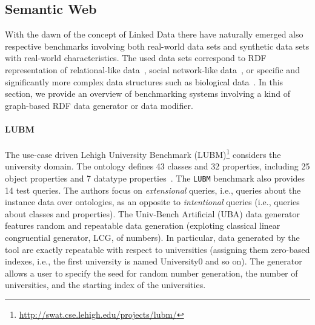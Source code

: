 \subsection{Semantic Web}
\label{sec:generators_LinkedData}
With the dawn of the concept of Linked Data there have naturally emerged also respective benchmarks involving both real-world data sets and synthetic data sets with real-world characteristics. The used data sets correspond to RDF representation of relational-like data~\cite{Guo2005158,Bizer09theberlin}, social network-like data~\cite{Schmidt2010}, or specific and significantly more complex data structures such as biological data~\cite{Wu2014}. In this section, we provide an overview of benchmarking systems involving a kind of graph-based RDF data generator or data modifier. %

\iffalse
Considering the Big Data world, the Linked Data in general definitely belong to this group since we assume that the Linked (Open) Data Sets form a common Linked Open Data cloud\footnote{\url{http://lod-cloud.net/}}. On the other hand, the particular data sets can be relatively small.
\fi

\paragraph{LUBM} The use-case driven Lehigh University Benchmark (LUBM)\footnote{\url{http://swat.cse.lehigh.edu/projects/lubm/}} considers the university domain. The ontology defines 43 classes and 32 properties, including 25 object properties and 7 datatype properties~\cite{Guo2005158}. The \texttt{LUBM} benchmark also provides 14 test queries. The authors focus on \emph{extensional} queries, i.e., queries about the instance data over ontologies, as an opposite to \emph{intentional} queries (i.e., queries about classes and properties). The Univ-Bench Artificial  (UBA) data generator features random and repeatable data generation (exploting classical linear congruential generator, LCG, of numbers). In particular, data generated by the tool are exactly repeatable with respect to universities (assigning them zero-based indexes, i.e., the first university is named University0 and so on).  The generator allows a user to specify the seed for random number generation, the number of universities, and the starting index of the universities.

